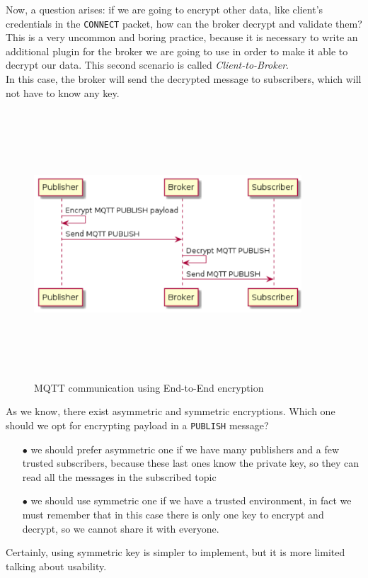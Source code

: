 \documentclass[12pt]{report}
\begin{document}
{Now, a question arises: if we are going to encrypt other data, like client's credentials in the \texttt{CONNECT} packet, how can the broker decrypt and validate them?
This is a very uncommon and boring practice, because it is necessary to write an additional plugin for the broker we are going to use in order to make it able to decrypt our data. 
This second scenario is called \emph{Client-to-Broker}.\\
In this case, the broker will send the decrypted message to subscribers, which will not have to know any key.

\begin{figure}[H]
\includegraphics[width=10cm,height=10cm,keepaspectratio]{client_to_broker}
\centering
\caption{MQTT communication using End-to-End encryption}
\end{figure}

As we know, there exist asymmetric and symmetric encryptions. Which one should we opt for encrypting payload in a \texttt{PUBLISH} message?

\begin{itemize}
\setlength{\itemindent}{+4mm}
  \item[$\bullet$] we should prefer asymmetric one if we have many publishers and a few trusted subscribers, because these last ones know the private key, so they can read all the messages in the subscribed topic
  \item[$\bullet$] we should use symmetric one if we have a trusted environment, in fact we must remember that in this case there is only one key to encrypt and decrypt, so we cannot share it with everyone.
\end{itemize}
\bigskip
Certainly, using symmetric key is simpler to implement, but it is more limited talking about usability.

}
\end{document}
